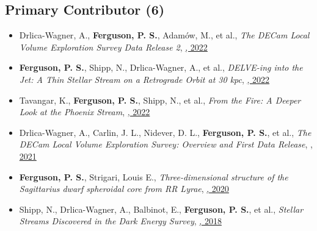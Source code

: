 \renewcommand{\labelitemi}{$$}
\subsection{Primary Contributor  (6)}
\begin{itemize}[itemsep=1pt]
    \item {Drlica-Wagner}, A., \textbf{Ferguson, P. S.}, {Adam{\'o}w}, M., et al., \textit{{The DECam Local Volume Exploration Survey Data Release 2}}, \href{https://ui.adsabs.harvard.edu/abs/2022ApJS..261...38D}{\textbf{\apjs}, 2022}
    \item \textbf{Ferguson, P. S.}, {Shipp}, N., {Drlica-Wagner}, A., et al., \textit{{DELVE-ing into the Jet: A Thin Stellar Stream on a Retrograde Orbit at 30 kpc}}, \href{https://ui.adsabs.harvard.edu/abs/2022AJ....163...18F}{\textbf{\aj}, 2022}
    \item {Tavangar}, K., \textbf{Ferguson, P. S.}, {Shipp}, N., et al., \textit{{From the Fire: A Deeper Look at the Phoenix Stream}}, \href{https://ui.adsabs.harvard.edu/abs/2022ApJ...925..118T}{\textbf{\apj}, 2022}
    \item {Drlica-Wagner}, A., {Carlin}, J. L., {Nidever}, D. L., \textbf{Ferguson, P. S.}, et al., \textit{{The DECam Local Volume Exploration Survey: Overview and First Data Release}}, \href{https://ui.adsabs.harvard.edu/abs/2021ApJS..256....2D}{\textbf{\apjs}, 2021}
    \item \textbf{Ferguson, P. S.}, {Strigari}, Louis E., \textit{{Three-dimensional structure of the Sagittarius dwarf spheroidal core from RR Lyrae}}, \href{https://ui.adsabs.harvard.edu/abs/2020MNRAS.495.4124F}{\textbf{\mnras}, 2020}
    \item {Shipp}, N., {Drlica-Wagner}, A., {Balbinot}, E., \textbf{Ferguson, P. S.}, et al., \textit{{Stellar Streams Discovered in the Dark Energy Survey}}, \href{https://ui.adsabs.harvard.edu/abs/2018ApJ...862..114S}{\textbf{\apj}, 2018}
\end{itemize}
